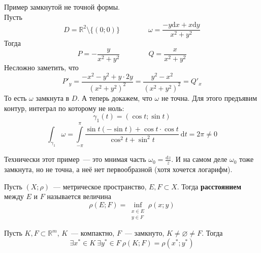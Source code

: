\documentclass{article}
\begin{document}
    \begin{example}
        Пример замкнутой не точной формы.\\
        Пусть
        $$D=\mathbb R^2\setminus\{(0;0)\}\qquad\qquad\omega=\frac{-y\mathrm dx+x\mathrm dy}{x^2+y^2}$$
        Тогда
        $$
        P=-\frac y{x^2+y^2}\qquad\qquad Q=\frac x{x^2+y^2}
        $$
        Несложно заметить, что
        $$
        P'_y=\frac{-x^2-y^2+y\cdot 2y}{(x^2+y^2)^2}=\frac{y^2-x^2}{(x^2+y^2)^2}=Q'_x
        $$
        То есть $\omega$ замкнута в $D$. А теперь докажем, что $\omega$ не точна. Для этого предъявим контур, интеграл по которому не ноль:
        $$
        \gamma_1(t)=(\cos t;\sin t)
        $$
        $$
        \int_{\gamma_1}\omega=\int\limits_{-\pi}^\pi\frac{\sin t(-\sin t)+\cos t\cdot\cos t}{\cos^2t+\sin^2t}~\mathrm dt=2\pi\neq0
        $$
    \end{example}
    \begin{remark}
        Технически этот пример~--- это мнимая часть $\omega_0=\frac{\mathrm dz}z$. И на самом деле $\omega_0$ тоже замкнута, но не точна, а неё нет первообразной (хотя хочется логарифм).
    \end{remark}
    \begin{definition}
        Пусть $(X;\rho)$~--- метрическое пространство, $E,F\subset X$. Тогда \textbf{расстоянием} между $E$ и $F$ называется величина
        $$
        \rho(E;F)=\inf\limits_{\substack{x\in E\\y\in F}}\rho(x;y)
        $$
    \end{definition}
    \begin{lemma}
        Пусть $K,F\subset\mathbb R^m$, $K$~--- компактно, $F$~--- замкнуто, $K\neq\varnothing\neq F$. Тогда
        $$
        \exists x^*\in K~\exists y^*\in F~\rho(K;F)=\rho(x^*;y^*)
        $$
    \end{lemma}
\end{document}
